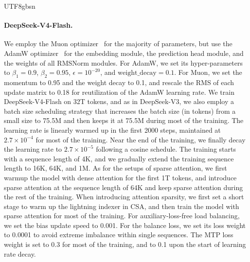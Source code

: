 \documentclass[11pt, a4paper, logo, copyright, nonumbering]{deepseek}
\newcommand{\dsviii}{DeepSeek-V3}
\newcommand{\dsvivf}{DeepSeek-V4-Flash}
\newcommand{\dsvivftoken}{32T}
\newcommand{\csa}{CSA}
\begin{document}
\begin{CJK*}{UTF8}{gbsn}
\paragraph{\dsvivf{}.}
We employ the Muon optimizer~\citep{muon,muon_kimi} for the majority of parameters, but use the AdamW optimizer~\citep{adamW} for the embedding module, the prediction head module, and the weights of all RMSNorm modules. 
For AdamW, we set its hyper-parameters to $\beta_1=0.9$, $\beta_2=0.95$, $\epsilon=10^{-20}$, and $\mathrm{weight\_decay}=0.1$. 
For Muon, we set the momentum to 0.95 and the weight decay to 0.1, and rescale the RMS of each update matrix to 0.18 for reutilization of the AdamW learning rate. 
We train \dsvivf{} on \dsvivftoken{} tokens, and as in \dsviii{}, we also employ a batch size scheduling strategy that increases the batch size (in tokens) from a small size to 75.5M and then keeps it at 75.5M during most of the training. 
The learning rate is linearly warmed up in the first 2000 steps, maintained at $2.7 \times 10^{-4}$ for most of the training. 
Near the end of the training, we finally decay the learning rate to $2.7 \times 10^{-5}$ following a cosine schedule.
The training starts with a sequence length of 4K, and we gradually extend the training sequence length to 16K, 64K, and 1M. 
As for the setups of sparse attention, we first warmup the model with dense attention for the first 1T tokens, and introduce sparse attention at the sequence length of 64K and keep sparse attention during the rest of the training. 
When introducing attention sparsity, we first set a short stage to warm up the lightning indexer in \csa{}, and then train the model with sparse attention for most of the training. 
For auxiliary-loss-free load balancing, we set the bias update speed to 0.001. 
For the balance loss, we set its loss weight to 0.0001 to avoid extreme imbalance within single sequences. 
The MTP loss weight is set to 0.3 for most of the training, and to 0.1 upon the start of learning rate decay. 


\end{CJK*}
\end{document}
